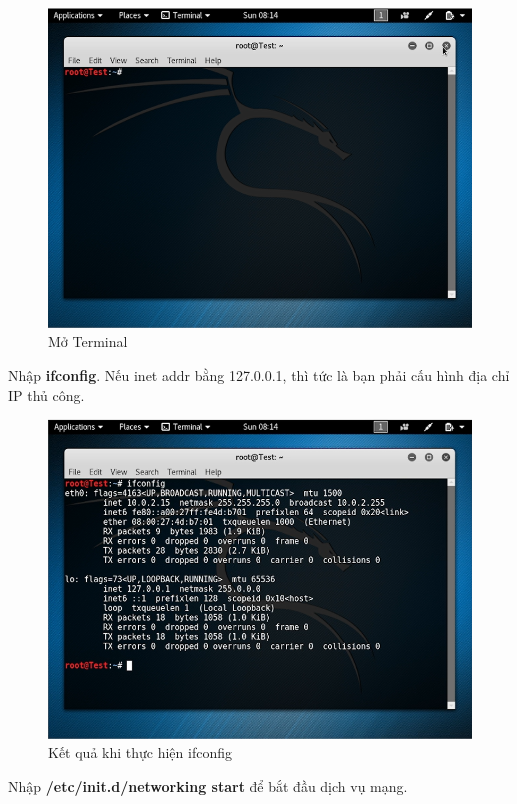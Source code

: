 \begin{figure}[!htb]
    \centering
    \includegraphics[width=0.85\linewidth]{figure//chapter5//lab5_1/terminal.png}
    \caption{Mở Terminal}
    \label{fig:enter-label}
\end{figure}

 Nhập \textbf{ifconfig}. Nếu inet addr bằng 127.0.0.1, thì tức là bạn phải cấu hình địa chỉ IP thủ công.

\begin{figure}[!htb]
    \centering
    \includegraphics[width=0.85\linewidth]{figure//chapter5//lab5_1/manual_configure.png}
    \caption{Kết quả khi thực hiện ifconfig}
    \label{fig:enter-label}
\end{figure}

\newpage

 Nhập \textbf{/etc/init.d/networking start} để bắt đầu dịch vụ mạng.

